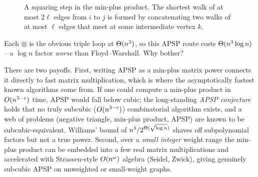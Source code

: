 \begin{figure}[htbp]
\centering
{}
\caption{A squaring step in the min-plus product. The shortest walk of at most $2\ell$ edges from $i$ to $j$ is formed by concatenating two walks of at most $\ell$ edges that meet at some intermediate vertex $k$.}
\label{fig:minplus-squaring}
\end{figure}

Each $\otimes$ is the obvious triple loop at $\Theta(n^3)$, so this APSP route costs $\Theta(n^3\log n)$ -- a
$\log n$ factor \emph{worse} than Floyd--Warshall. Why bother?

\begin{aestheticbox}
There are two payoffs. First, writing APSP as a min-plus matrix power connects it directly to fast matrix multiplication, which
is where the asymptotically fastest known algorithms come from. If one could compute a min-plus product in
$O(n^{3-\varepsilon})$ time, APSP would fall below cubic; the long-standing \emph{APSP conjecture} holds that
no truly subcubic ($O(n^{3-\varepsilon})$) combinatorial algorithm exists, and a web of problems (negative
triangle, min-plus product, APSP) are known to be subcubic-equivalent. Williams' bound of
$n^3/2^{\Theta(\sqrt{\log n})}$ shaves off subpolynomial factors but not a true power. Second, over a
\emph{small integer} weight range the min-plus product can be embedded into a few real matrix
multiplications and accelerated with Strassen-style $O(n^\omega)$ algebra (Seidel, Zwick), giving
genuinely subcubic APSP on unweighted or small-weight graphs.
\end{aestheticbox}

